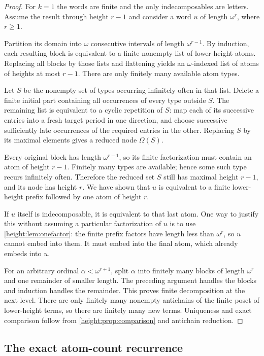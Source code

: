 \documentclass[11pt,a4paper]{article}
\numberwithin{equation}{section}
\theoremstyle{definition}
\theoremstyle{remark}
\begin{document}
\begin{proof}
For $k=1$ the words are finite and the only indecomposables are letters.
Assume the result through height $r-1$ and consider a word $u$ of length
$\omega^r$, where $r\ge1$.

Partition its domain into $\omega$ consecutive intervals of length
$\omega^{r-1}$. By induction, each resulting block is equivalent to a
finite nonempty list of lower-height atoms. Replacing all blocks by those
lists and flattening yields an $\omega$-indexed list of atoms of heights
at most $r-1$. There are only finitely many available atom types.

Let $S$ be the nonempty set of types occurring infinitely often in that
list. Delete a finite initial part containing all occurrences of every
type outside $S$. The remaining list is equivalent to a cyclic repetition
of $S$: map each of its successive entries into a fresh target period in
one direction, and choose successive sufficiently late occurrences of the
required entries in the other. Replacing $S$ by its maximal elements
gives a reduced node $\Omega(S)$.

Every original block has length $\omega^{r-1}$, so its finite factorization
must contain an atom of height $r-1$. Finitely many types are available;
hence some such type recurs infinitely often. Therefore the reduced set
$S$ still has maximal height $r-1$, and its node has height $r$.
We have shown that $u$ is equivalent to a finite lower-height prefix
followed by one atom of height $r$.

If $u$ itself is indecomposable, it is equivalent to that last atom.
One way to justify this without assuming a particular factorization of
$u$ is to use \cref{height:lem:onefactor}: the finite prefix factors have length
less than $\omega^r$, so $u$ cannot embed into them. It must embed into
the final atom, which already embeds into $u$.

For an arbitrary ordinal $\alpha<\omega^{r+1}$, split $\alpha$ into finitely
many blocks of length $\omega^r$ and one remainder of smaller length.
The preceding argument handles the blocks and induction handles the
remainder. This proves finite decomposition at the next level.
There are only finitely many nonempty antichains of the finite poset of
lower-height terms, so there are finitely many new terms. Uniqueness and
exact comparison follow from \cref{height:prop:comparison} and antichain reduction.
\end{proof}

\subsection{The exact atom-count recurrence}
\end{document}
